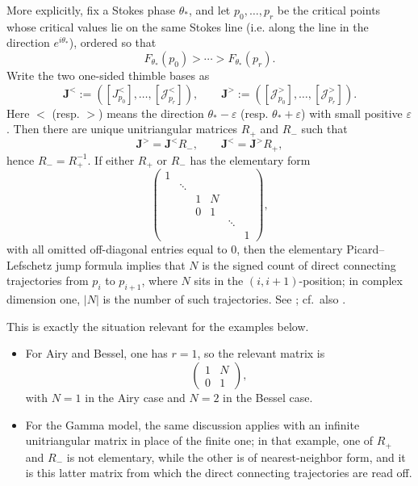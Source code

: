 \documentclass[11pt]{amsart}
\theoremstyle{plain}
\newcommand{\J}{\mathcal J}
\begin{document}
More explicitly, fix a Stokes phase \(\theta_*\), and let \(p_0,\dots,p_r\) be the critical points whose critical values lie on the same Stokes line (i.e. along the line in the direction $e^{i\theta_*}$), ordered so that
\begin{equation*}
F_{\theta_*}(p_0)>\cdots>F_{\theta_*}(p_r).
\end{equation*}
Write the two one-sided thimble bases as
\begin{equation*}
\mathbf J^<:=([J_{p_0}^<],\dots,[\J_{p_r}^<]),
\qquad
\mathbf J^>:=([\J_{p_0}^>],\dots,[\J_{p_r}^>]).
\end{equation*}
Here $<$ (resp. $>$) means the direction $\theta_*-\varepsilon$ (resp. $\theta_*+\varepsilon$) with small positive $\varepsilon$.
Then there are unique unitriangular matrices \(R_+\) and \(R_-\) such that 
\begin{equation*}
\mathbf J^>=\mathbf J^< R_-,
\qquad
\mathbf J^<=\mathbf J^> R_+,
\end{equation*}
hence \(R_-=R_+^{-1}\). If either \(R_+\) or \(R_-\) has the elementary form
\begin{equation*}
\begin{pmatrix}
1 &        &        &        &        &        \\
  & \ddots &        &        &        &        \\
  &        & 1      & N      &        &        \\
  &        & 0      & 1      &        &        \\
  &        &        &        & \ddots &        \\
  &        &        &        &        & 1
\end{pmatrix},
\end{equation*}
with all omitted off-diagonal entries equal to \(0\), then the elementary Picard--Lefschetz jump formula implies that \(N\) is the signed count of direct connecting trajectories from \(p_i\) to \(p_{i+1}\), where \(N\) sits in the \((i,i+1)\)-position; in complex dimension one, \(|N|\) is the number of such trajectories. See \cite[Sec.~3.1.2]{Witten2011CS}; cf.\ also \cite{AGV2,Pham1983,Vassiliev2002}.

This is exactly the situation relevant for the examples below. 
\begin{itemize}
    \item For Airy and Bessel, one has \(r=1\), so the relevant matrix is
\begin{equation*}
\begin{pmatrix}
1 & N\\
0 & 1
\end{pmatrix},
\end{equation*}
with \(N=1\) in the Airy case and \(N=2\) in the Bessel case.
   \item  For the Gamma model, the same discussion applies with an infinite unitriangular matrix in place of the finite one; in that example, one of \(R_+\) and \(R_-\) is not elementary, while the other is of nearest-neighbor form, and it is this latter matrix from which the direct connecting trajectories are read off.
\end{itemize}
\end{document}
